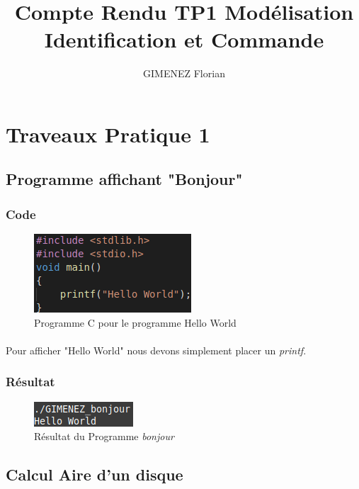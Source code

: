 \documentclass[10pt,a4paper]{article}
\author{GIMENEZ Florian}
\title{Compte Rendu TP1 Modélisation Identification et Commande}
\begin{document}
\normalem

\section{Traveaux Pratique 1}

\subsection{Programme affichant "Bonjour"}
\subsubsection{Code}
	\begin{figure}[h]
	\begin{center}
	\includegraphics[scale=.4]{images/bonjour_c}
	\end{center}
	\caption{Programme C pour le programme Hello World}
	\end{figure}
\paragraph{}
    Pour afficher "Hello World" nous devons simplement placer un \emph{printf}.

\subsubsection{Résultat}
	\begin{figure}[h]
	\begin{center}
	\includegraphics[scale=.4]{images/bonjour_ex}
	\end{center}
	\caption{Résultat du Programme \emph{bonjour}}
	\end{figure}

\subsection{Calcul Aire d'un disque}
\end{document}
